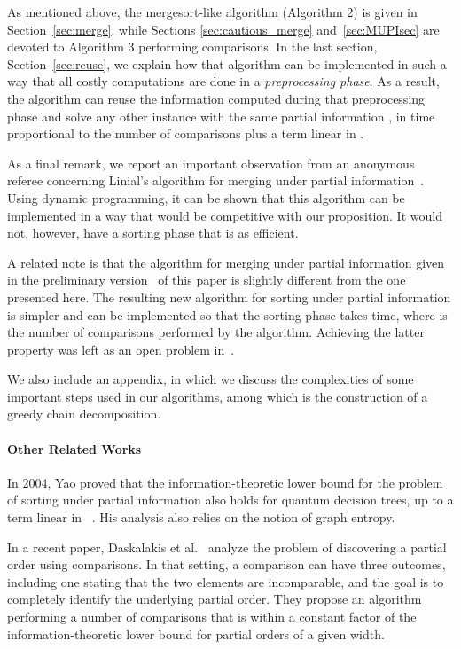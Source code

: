 \documentclass{article} \usepackage{fullpage}
\begin{document}
As mentioned above, the mergesort-like algorithm (Algorithm 2) is given in Section~\ref{sec:merge},
while Sections \ref{sec:cautious_merge} and~\ref{sec:MUPIsec} are devoted to
Algorithm 3 performing  comparisons. In the last section, Section~\ref{sec:reuse}, we explain how that algorithm can be implemented in such a way that all costly computations are done in a {\em preprocessing phase}. As a result, the algorithm can reuse the information computed during that preprocessing phase and solve any other instance with the same partial information , in time proportional to the number of comparisons plus a term linear in .

As a final remark, we report an important observation from an anonymous referee concerning Linial's algorithm for merging under partial information~\cite{L84}. Using dynamic programming, it can be shown that this algorithm can be implemented in a way that would be competitive with our proposition. It would not, however, have a sorting phase that is as efficient.

A related note is that the algorithm for merging under partial information given in the preliminary version~\cite{SUPI-STOC} of this paper is slightly different from the one presented here. The resulting new algorithm for sorting under partial information is simpler and can be implemented so that the sorting phase takes  time, where  is the number of comparisons performed by the algorithm. Achieving the latter property was left as an open problem in~\cite{SUPI-STOC}.

We also include an appendix, in which we discuss the complexities of some important steps used in our algorithms, among which is the construction of a greedy chain decomposition.

\paragraph*{Other Related Works}
In 2004, Yao proved that the information-theoretic lower bound for the problem of sorting under partial information also holds for quantum decision trees, up to a term linear in ~\cite{Yao04}. His analysis also relies on the notion of graph entropy.

In a recent paper, Daskalakis et al.~\cite{DKMRV09} analyze the problem of discovering a partial order using comparisons. In that setting, a comparison can have three outcomes, including one stating that the two elements are incomparable, and the goal is to completely identify the underlying partial order. They propose an algorithm performing a number of comparisons that is within a constant factor of the information-theoretic lower bound for partial orders of a given width.
\end{document}
